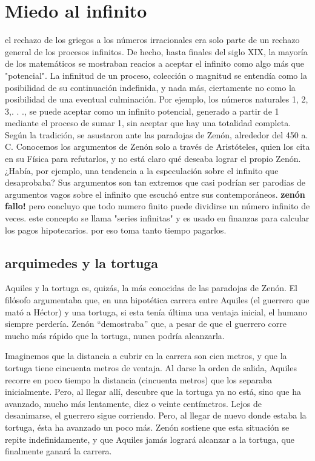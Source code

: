 \documentclass{book}
\begin{document}
    \section{Miedo al infinito}
    el rechazo de los griegos a los números irracionales era solo parte de un rechazo general de los procesos infinitos.
    De hecho, hasta finales del siglo XIX, la mayoría de los matemáticos se mostraban reacios a aceptar el infinito como algo más que "potencial".
    La infinitud de un proceso, colección o magnitud se entendía como la posibilidad de su continuación indefinida, y nada más, ciertamente no como la posibilidad de una eventual culminación. Por ejemplo, los números naturales 1, 2, 3,. . ., se puede aceptar como un infinito potencial, generado a partir de 1 mediante el proceso de sumar 1, sin aceptar que hay una totalidad completa.
    Según la tradición, se asustaron ante las paradojas de Zenón, alrededor del 450 a. C.
    Conocemos los argumentos de Zenón solo a través de Aristóteles, quien los cita
    en su Física para refutarlos, y no está claro qué deseaba lograr el propio Zenón. ¿Había, por ejemplo, una tendencia a la especulación sobre el infinito que desaprobaba? Sus argumentos son tan extremos que casi podrían ser parodias de argumentos vagos sobre el infinito que escuchó entre
    sus contemporáneos.
    \textbf{zenón fallo!} pero concluyo que todo numero finito puede dividirse un número infinito de veces.
    este concepto se llama "series infinitas" y es usado en finanzas para calcular los pagos hipotecarios. por eso toma tanto tiempo pagarlos.
    \subsection{arquimedes y la tortuga}
    Aquiles y la tortuga es, quizás, la más conocidas de las paradojas de Zenón. 
    El filósofo argumentaba que, en una hipotética carrera entre Aquiles (el guerrero que mató a Héctor) 
    y una tortuga,  si esta tenía última una ventaja inicial, el humano siempre perdería. 
    Zenón “demostraba” que, a pesar de que el guerrero corre mucho más rápido que la tortuga, 
    nunca podría alcanzarla.

    Imaginemos que la distancia a cubrir en la carrera son cien metros, 
    y que la tortuga tiene cincuenta metros de ventaja. Al darse la orden de salida, 
    Aquiles recorre en poco tiempo la distancia (cincuenta metros) que los separaba inicialmente. 
    Pero, al llegar allí, descubre que la tortuga ya no está, sino que ha avanzado, mucho más 
    lentamente, diez o veinte centímetros. Lejos de desanimarse, el guerrero sigue corriendo. 
    Pero, al llegar de nuevo donde estaba la tortuga, ésta ha avanzado un poco más. 
    Zenón sostiene que esta situación se repite indefinidamente, y que Aquiles jamás 
    logrará alcanzar a la tortuga, que finalmente ganará la carrera.
    
\end{document}
